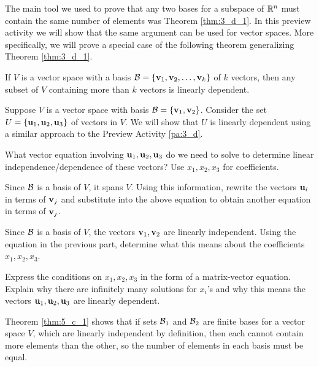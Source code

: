 \begin{pa} \label{pa:5_c} The main tool we used to prove that any two bases for a subspace of $\mathbb{R}^n$ must contain the same number of elements was Theorem \ref{thm:3_d_1}. In this preview activity we will show that the same argument can be used for vector spaces. More specifically, we will prove a special case of the following theorem generalizing Theorem \ref{thm:3_d_1}.

\begin{theorem} \label{thm:5_c_1} If $V$ is a vector space with a basis $\mathcal{B} = \{\mathbf{v}_1, \mathbf{v}_2, \ldots, \mathbf{v}_k\}$ of $k$ vectors, then any subset of $V$ containing more than $k$ vectors is linearly dependent.
\end{theorem} 

Suppose $V$ is a vector space with basis $\mathcal{B} = \{\mathbf{v}_1, \mathbf{v}_2\}$. Consider the set $U=\{\mathbf{u}_1, \mathbf{u}_2, \mathbf{u}_3\}$ of vectors in $V$. We will show that $U$ is linearly dependent using a similar approach to the Preview Activity \ref{pa:3_d}.

\be

\item What vector equation involving $\mathbf{u}_1, \mathbf{u}_2, \mathbf{u}_3$ do we need to solve to determine linear independence/dependence of these vectors? Use $x_1, x_2, x_3$ for coefficients.

\item Since $\mathcal{B}$ is a basis of $V$, it spans $V$. Using this information, rewrite the vectors $\mathbf{u}_i$ in terms of $\mathbf{v}_j$ and substitute into the above equation to obtain another equation in terms of $\mathbf{v}_j$.

\item Since $\mathcal{B}$ is a basis of $V$, the vectors $\mathbf{v}_1, \mathbf{v}_2$ are linearly independent. Using the equation in the previous part, determine what this means about the coefficients $x_1, x_2, x_3$.

\item Express the conditions on $x_1, x_2, x_3$ in the form of a matrix-vector equation. Explain why there are infinitely many solutions for $x_i$'s and why this means the vectors $\mathbf{u}_1, \mathbf{u}_2, \mathbf{u}_3$ are linearly dependent.

\ee


\end{pa}



\label{sec:finite_dim_space}


Theorem \ref{thm:5_c_1} shows that if sets $\mathcal{B}_1$ and $\mathcal{B}_2$ are finite bases for a vector space $V$, which are linearly independent by definition, then each cannot contain more elements than the other, so the number of elements in each basis must be equal. 

